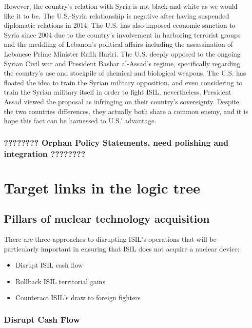 \documentclass{report}
\begin{document}
However, the country's relation with Syria is not black-and-white as we would like it to be. The U.S.-Syria relationship is negative after having suspended diplomatic relations in 2014. The U.S. has also imposed economic sanction to Syria since 2004 due to the country's involvement in harboring terrorist groups and the meddling of Lebanon's political affairs including the assassination of Lebanese Prime Minister Rafik Hariri. The U.S. deeply opposed to the ongoing Syrian Civil war and President Bashar al-Assad's regime, specifically regarding the country's use and stockpile of chemical and biological weapons. The U.S. has floated the idea to train the Syrian military opposition, and even considering to train the Syrian military itself in order to fight ISIL, nevertheless, President Assad viewed the proposal as infringing on their country's sovereignty. Despite the two countries differences, they actually both share a common enemy, and it is hope this fact can be harnessed to U.S.' advantage.


\subsubsection{????????  Orphan Policy Statements, need polishing and integration ????????}


\section{Target links in the logic tree}

\subsection{Pillars of nuclear technology acquisition }

There are three approaches to disrupting ISIL's operations that will be particularly important in ensuring that ISIL does not acquire a nuclear device:

\begin{itemize}
  \item Disrupt ISIL cash flow
  \item Rollback ISIL territorial gains
  \item Counteract ISIL's draw to foreign fighters
\end{itemize}

\subsubsection{Disrupt Cash Flow}
\end{document}
